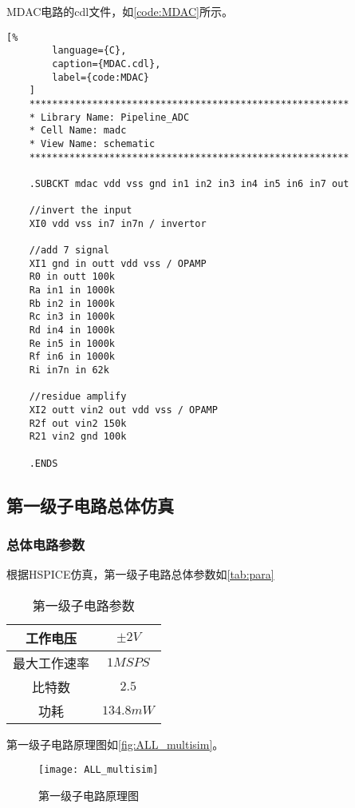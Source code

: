     \par MDAC电路的cdl文件，如\autoref{code:MDAC}所示。
    \begin{lstlisting}[%
        language={C},
        caption={MDAC.cdl},
        label={code:MDAC}
    ]
    ********************************************************
    * Library Name: Pipeline_ADC
    * Cell Name: madc
    * View Name: schematic
    ********************************************************

    .SUBCKT mdac vdd vss gnd in1 in2 in3 in4 in5 in6 in7 out

    //invert the input
    XI0 vdd vss in7 in7n / invertor

    //add 7 signal
    XI1 gnd in outt vdd vss / OPAMP
    R0 in outt 100k
    Ra in1 in 1000k
    Rb in2 in 1000k
    Rc in3 in 1000k
    Rd in4 in 1000k
    Re in5 in 1000k
    Rf in6 in 1000k
    Ri in7n in 62k

    //residue amplify
    XI2 outt vin2 out vdd vss / OPAMP
    R2f out vin2 150k
    R21 vin2 gnd 100k

    .ENDS
    \end{lstlisting}



\subsection{第一级子电路总体仿真}
    \subsubsection{总体电路参数}
    根据HSPICE仿真，第一级子电路总体参数如\autoref{tab:para}
    \begin{table}[H]
        \centering
        \caption{\label{tab:para}第一级子电路参数}
        \begin{tabular}{|c|c|}
            \hline
            工作电压 & $ \pm 2V $ \\ \hline
            最大工作速率 & $1MSPS$ \\ \hline
            比特数 & $2.5$  \\ \hline
            功耗 & $134.8mW$  \\ \hline
        \end{tabular}
    \end{table}

    \par 第一级子电路原理图如\autoref{fig:ALL_multisim}。
    \begin{figure}[H]
        \centering
        \texttt{[image: ALL\_multisim]}
        \caption{\label{fig:ALL_multisim}第一级子电路原理图}
    \end{figure}

